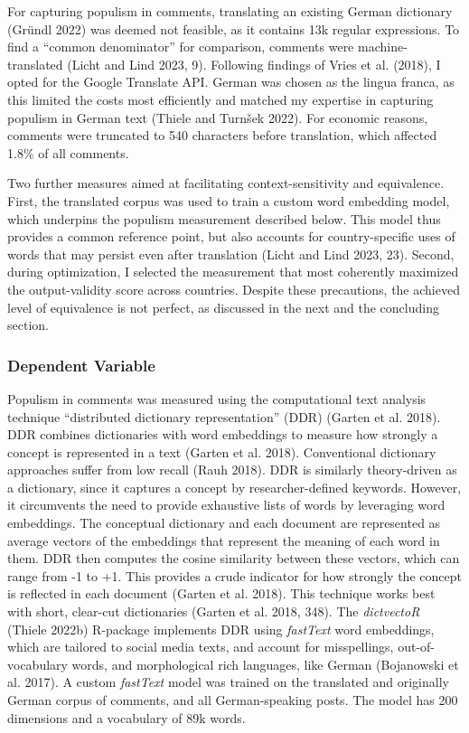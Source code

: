 \documentclass[
]{ccr}
\begin{document}
For capturing populism in comments, translating an existing German
dictionary (Gründl 2022) was deemed not feasible, as it contains 13k
regular expressions. To find a ``common denominator'' for comparison,
comments were machine-translated (Licht and Lind 2023, 9). Following
findings of Vries et al. (2018), I opted for the Google Translate API.
German was chosen as the lingua franca, as this limited the costs most
efficiently and matched my expertise in capturing populism in German
text (Thiele and Turnšek 2022). For economic reasons, comments were
truncated to 540 characters before translation, which affected 1.8\% of
all comments.

Two further measures aimed at facilitating context-sensitivity and
equivalence. First, the translated corpus was used to train a custom
word embedding model, which underpins the populism measurement described
below. This model thus provides a common reference point, but also
accounts for country-specific uses of words that may persist even after
translation (Licht and Lind 2023, 23). Second, during optimization, I
selected the measurement that most coherently maximized the
output-validity score across countries. Despite these precautions, the
achieved level of equivalence is not perfect, as discussed in the next
and the concluding section.

\hypertarget{dependent-variable}{%
\subsubsection{Dependent Variable}\label{dependent-variable}}

Populism in comments was measured using the computational text analysis
technique ``distributed dictionary representation'' (DDR) (Garten et al.
2018). DDR combines dictionaries with word embeddings to measure how
strongly a concept is represented in a text (Garten et al. 2018).
Conventional dictionary approaches suffer from low recall (Rauh 2018).
DDR is similarly theory-driven as a dictionary, since it captures a
concept by researcher-defined keywords. However, it circumvents the need
to provide exhaustive lists of words by leveraging word embeddings. The
conceptual dictionary and each document are represented as average
vectors of the embeddings that represent the meaning of each word in
them. DDR then computes the cosine similarity between these vectors,
which can range from -1 to +1. This provides a crude indicator for how
strongly the concept is reflected in each document (Garten et al. 2018).
This technique works best with short, clear-cut dictionaries (Garten et
al. 2018, 348). The \emph{dictvectoR} (Thiele 2022b) R-package
implements DDR using \emph{fastText} word embeddings, which are tailored
to social media texts, and account for misspellings, out-of-vocabulary
words, and morphological rich languages, like German (Bojanowski et al.
2017). A custom \emph{fastText} model was trained on the translated and
originally German corpus of comments, and all German-speaking posts. The
model has 200 dimensions and a vocabulary of 89k words.
\end{document}
